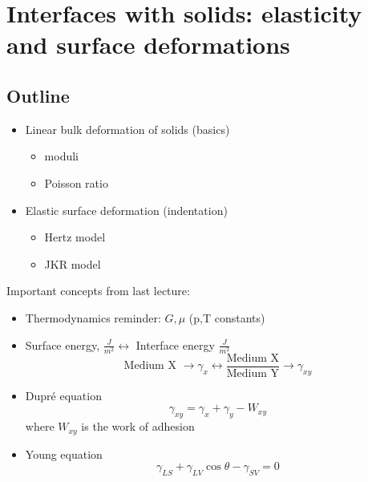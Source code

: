 \documentclass[a4paper, 11pt, normalem]{report}
\begin{document}
\chapter{Interfaces with solids: elasticity and surface deformations}
\section{Outline}
\begin{itemize}
    \item Linear bulk deformation of solids (basics)
        \begin{itemize}
            \item moduli
            \item Poisson ratio
        \end{itemize}
    \item Elastic surface deformation (indentation)
        \begin{itemize}
            \item Hertz model
            \item JKR model
        \end{itemize}
\end{itemize}

Important concepts from last lecture:
\begin{itemize}
    \item Thermodynamics reminder: $G,\mu$ (p,T constants)
    \item Surface energy, $\frac{J}{m^2} \leftrightarrow$ Interface energy $\frac{J}{m^2}$
        \begin{equation*}
            \text{Medium X } \to \gamma_x \leftrightarrow \frac{\text{Medium X}}{\text{Medium Y}} \to \gamma_{xy}
        \end{equation*}
    \item Dupr\'{e} equation
        \begin{equation}
            \gamma_{xy} = \gamma_x + \gamma_y - W_{xy}
        \end{equation}
        where $W_{xy}$ is the work of adhesion
    \item Young equation
        \begin{equation}
            \gamma_{LS} + \gamma_{LV}\cos\theta - \gamma_{SV} = 0
        \end{equation}
        \begin{figure}[H]
            \centering
        \end{figure}
\end{itemize}
\end{document}
